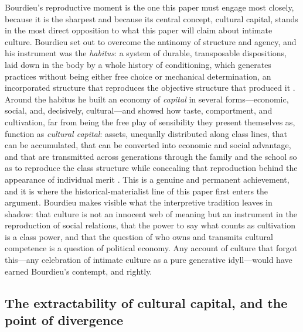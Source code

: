 Bourdieu's reproductive moment is the one this paper must engage most closely, because it is the sharpest and because its central concept, cultural capital, stands in the most direct opposition to what this paper will claim about intimate culture. Bourdieu set out to overcome the antinomy of structure and agency, and his instrument was the \emph{habitus}: a system of durable, transposable dispositions, laid down in the body by a whole history of conditioning, which generates practices without being either free choice or mechanical determination, an incorporated structure that reproduces the objective structure that produced it \parencite{bourdieu1984}. Around the habitus he built an economy of \emph{capital} in several forms---economic, social, and, decisively, cultural---and showed how taste, comportment, and cultivation, far from being the free play of sensibility they present themselves as, function as \emph{cultural capital}: assets, unequally distributed along class lines, that can be accumulated, that can be converted into economic and social advantage, and that are transmitted across generations through the family and the school so as to reproduce the class structure while concealing that reproduction behind the appearance of individual merit \parencite{bourdieu1986}. This is a genuine and permanent achievement, and it is where the historical-materialist line of this paper first enters the argument. Bourdieu makes visible what the interpretive tradition leaves in shadow: that culture is not an innocent web of meaning but an instrument in the reproduction of social relations, that the power to say what counts as cultivation is a class power, and that the question of who owns and transmits cultural competence is a question of political economy. Any account of culture that forgot this---any celebration of intimate culture as a pure generative idyll---would have earned Bourdieu's contempt, and rightly.

\subsection*{The extractability of cultural capital, and the point of divergence}


